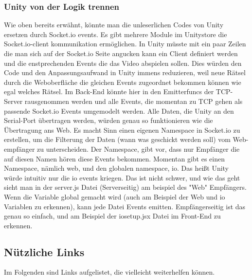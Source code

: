 \documentclass[12pt]{article} %
\begin{document}
\subsubsection{Unity von der Logik trennen}
Wie oben bereits erwähnt, könnte man die unleserlichen Codes von Unity ersetzen durch Socket.io events. Es gibt mehrere Module im Unitystore die Socket.io-client kommunikation ermöglichen.
In Unity müsste mit ein paar Zeilen die man sich auf der Socket.io Seite angucken kann ein Client definiert werden und die enstprechenden Events die das Video abspielen sollen.
Dies würden den Code und den Anpassungsaufwand in Unity immens reduzieren, weil neue Rätsel durch die Weboberfläche die gleichen Events zugeordnet bekommen können wie egal welches Rätsel.
Im Back-End könnte hier in den Emitterfuncs der TCP-Server rausgenommen werden und alle Events, die momentan zu TCP gehen als passende Socket.io Events umgemodelt werden. 
Alle Daten, die Unity an den Serial-Port übertragen werden, würden genau so funktionieren wie die Übertragung ans Web. 
Es macht Sinn einen eigenen Namespace in Socket.io zu erstellen, um die Filterung der Daten (wann was geschickt werden soll) vom Web-empfänger zu unterscheiden.
Der Namespace, gibt vor, dass nur Empfänger die auf diesen Namen hören diese Events bekommen. Momentan gibt es einen Namespace, nämlich web, und den globalen namespace, io. Das heißt Unity würde intuitiv nur die io events kriegen.
Das ist nicht schwer, und wie das geht sieht man in der server.js Datei (Serverseitig) am beispiel des "Web" Empfängers. Wenn die Variable global gemacht wird (auch am Beispiel der Web und io Variablen zu erkennen), kann jede Datei Events emitten.
Empfängerseitig ist das genau so einfach, und am Beispiel der iosetup.jsx Datei im Front-End zu erkennen.

\subsection{Nützliche Links} %
Im Folgenden sind Links aufgelistet, die vielleicht weiterhelfen können.
\end{document}
